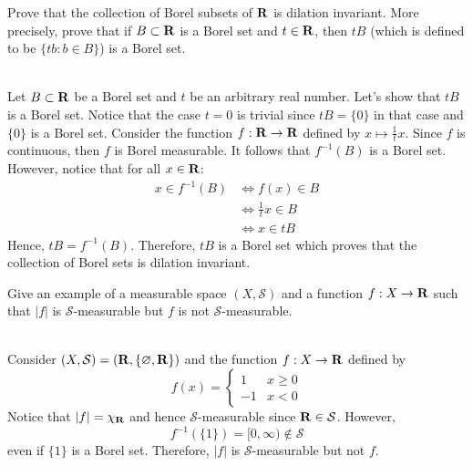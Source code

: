 \begin{exercise}
    Prove that the collection of Borel subsets of $\mathbf{R}$ is dilation invariant. More precisely, prove that if $B \subset \mathbf{R}$ is a Borel set and $t \in \mathbf{R}$, then $tB$ (which is defined to be $\{tb:b\in B\}$) is a Borel set.\\
\end{exercise}

\begin{solution}
    \\ Let $B \subset \mathbf{R}$ be a Borel set and $t$ be an arbitrary real number. Let's show that $tB$ is a Borel set. Notice that the case $t = 0$ is trivial since $tB = \{0\}$ in that case and $\{0\}$ is a Borel set. Consider the function $f : \mathbf{R} \to \mathbf{R}$ defined by $x \mapsto \frac{1}{t}x$. Since $f$ is continuous, then $f$ is Borel measurable. It follows that $f^{-1}(B)$ is a Borel set. However, notice that for all $x \in \mathbf{R}$:
    \begin{align*}
        x \in f^{-1}(B) &\iff f(x) \in B \\
        &\iff \frac{1}{t}x \in B \\
        &\iff x \in tB
    \end{align*}
    Hence,  $tB = f^{-1}(B)$. Therefore, $tB$ is a Borel set which proves that the collection of Borel sets is dilation invariant.\\
\end{solution}

\begin{exercise}
    Give an example of a measurable space $(X, \mathcal{S})$ and a function $f: X \to \mathbf{R}$ such that $|f|$ is $\mathcal{S}$-measurable but $f$ is not $\mathcal{S}$-measurable. \\
\end{exercise}

\begin{solution}
    \\ Consider $(X, \mathcal{S}) = (\mathbf{R}, \{ \varnothing, \mathbf{R}\})$ and the function $f:X \to \mathbf{R}$ defined by 
    $$f(x) = \begin{cases}
        1 & x \geq 0 \\
        -1 & x < 0
    \end{cases}$$
    Notice that $|f| = \chi_{\mathbf{R}}$ and hence $\mathcal{S}$-measurable since $\mathbf{R} \in \mathcal{S}$. However, 
    $$f^{-1}(\{1\}) = [0, \infty) \notin \mathcal{S}$$
    even if $\{1\}$ is a Borel set. Therefore, $|f|$ is $\mathcal{S}$-measurable but not $f$. \\ 
\end{solution}

